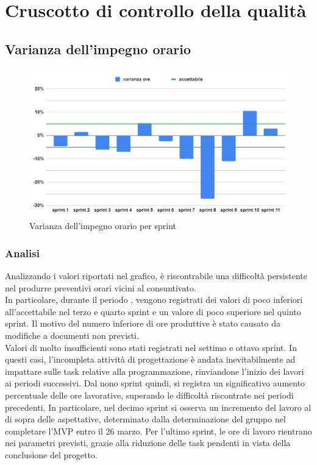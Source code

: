 \chapter{Cruscotto di controllo della qualità} \label{sec:cruscotto}

\section{Varianza dell'impegno orario}
\begin{figure}[H]
    \centering
    \includegraphics[width=0.8\linewidth]{VarOre.png}
    \caption{Varianza dell'impegno orario per sprint}
\end{figure}
\subsection{Analisi}
Analizzando i valori riportati nel grafico, è riscontrabile una difficoltà persistente nel produrre preventivi orari vicini al consuntivato.\\
In particolare, durante il periodo , vengono registrati dei valori di poco inferiori all'accettabile nel terzo e quarto sprint e un valore di poco superiore nel quinto sprint. Il motivo del numero inferiore di ore produttive è stato causato da modifiche a documenti non previsti.\\
Valori di molto insufficienti sono stati registrati nel settimo e ottavo sprint. In questi casi, l'incompleta attività di progettazione è andata inevitabilmente ad impattare sulle task relative alla programmazione, rinviandone l'inizio dei lavori ai periodi successivi.
Dal nono sprint quindi, si registra un significativo aumento percentuale delle ore lavorative, superando le difficoltà riscontrate nei periodi precedenti. In particolare, nel decimo sprint si osserva un incremento del lavoro al di sopra delle aspettative, determinato dalla determinazione del gruppo nel completare l'MVP entro il 26 marzo. Per l'ultimo sprint, le ore di lavoro rientrano nei parametri previsti, grazie alla riduzione delle task pendenti in vista della conclusione del progetto.

